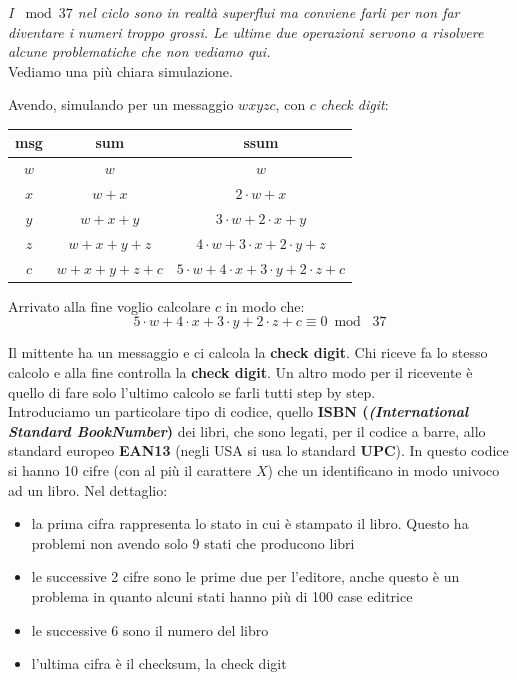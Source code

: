 \documentclass[a4paper,12pt, oneside]{book}
\begin{document}
\textit{I $\bmod 37$ nel ciclo sono in realtà superflui ma conviene farli per
  non far diventare i numeri troppo grossi. Le ultime due operazioni servono a
  risolvere alcune problematiche che non vediamo qui.}\\
Vediamo una più chiara simulazione.
\begin{esempio}
  Avendo, simulando per un messaggio $wxyzc$, con $c$ \textit{check digit}:
  \begin{table}[H]
    \centering
    \begin{tabular}{|c|c|c|}
      \hline
      msg & sum & ssum \\
      \hline
      $w$ & $w$ & $w$ \\
      $x$ & $w+x$ & $2\cdot w+x$ \\
      $y$ & $w+x+y$ & $3\cdot w+2\cdot x+y$ \\
      $z$ & $w+x+y+z$ & $4\cdot w+ 3\cdot x+2\cdot y+z$ \\
      \hline
      $c$ & $w+x+y+z+c$ & $5\cdot w+4\cdot x+3\cdot y+2\cdot z+c$ \\
      \hline
    \end{tabular}
  \end{table}
  Arrivato alla fine voglio calcolare $c$ in modo che:
  \[5\cdot w+4\cdot x+3\cdot y+2\cdot z+c \equiv 0 \bmod\,\, 37\]
\end{esempio}
Il mittente ha un messaggio e ci calcola la \textbf{check digit}.
Chi riceve fa lo stesso calcolo e alla fine controlla la \textbf{check
  digit}. Un altro modo per il ricevente è quello di fare solo l'ultimo calcolo
se farli tutti step by step.\\
Introduciamo un particolare tipo di codice, quello \textbf{ISBN
  (\textit{(International Standard BookNumber})} dei libri, che 
sono legati, per il codice a barre, allo standard europeo \textbf{EAN13} (negli
USA si usa lo standard 
\textbf{UPC}). In questo codice si hanno 10 cifre (con al più il carattere $X$)
che un identificano in modo univoco ad un libro. Nel dettaglio:
\begin{itemize}
  \item la prima cifra rappresenta lo stato in cui è stampato il libro. Questo
  ha problemi non avendo solo 9 stati che producono libri
  \item le successive 2 cifre sono le prime due per l'editore, anche questo è un
  problema in quanto alcuni stati hanno più di 100 case editrice
  \item le successive 6 sono il numero del libro
  \item l'ultima cifra è il checksum, la check digit
\end{itemize}
\end{document}
